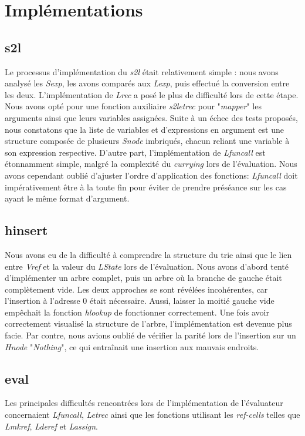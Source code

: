 \documentclass[12pt]{article}
\begin{document}
\section{Implémentations}
\subsection{s2l}
    Le processus d'implémentation du \textit{s2l} était relativement simple : nous avons analysé les \textit{Sexp}, les avons comparés aux \textit{Lexp}, puis effectué la conversion entre les deux. L'implémentation de \textit{Lrec} a posé le plus de difficulté lors de cette étape. Nous avons opté pour une fonction auxiliaire \textit{s2letrec} pour "\textit{mapper}" les arguments ainsi que leurs variables assignées. Suite à un échec des tests proposés, nous constatons que la liste de variables et d'expressions en argument est une structure composée de plusieurs \textit{Snode} imbriqués, chacun reliant une variable à son expression respective. D'autre part, l'implémentation de \textit{Lfuncall} est étonnamment simple, malgré la complexité du \textit{currying} lors de l'évaluation. Nous avons cependant oublié d'ajuster l'ordre d'application des fonctions: \textit{Lfuncall} doit impérativement être à la toute fin pour éviter de prendre préséance sur les cas ayant le même format d'argument.
\pagebreak
\subsection{hinsert}
    Nous avons eu de la difficulté à comprendre la structure du trie ainsi que le lien entre \textit{Vref} et la valeur du \textit{LState} lors de l'évaluation. Nous avons d'abord tenté d'implémenter un arbre complet, puis un arbre où la branche de gauche était complètement vide. Les deux approches se sont révélées incohérentes, car l'insertion à l'adresse 0 était nécessaire. Aussi, laisser la moitié gauche vide empêchait la fonction \textit{hlookup} de fonctionner correctement. Une fois avoir correctement visualisé la structure de l'arbre, l'implémentation est devenue plus facie. Par contre, nous avions oublié de vérifier la parité lors de l'insertion sur un \textit{Hnode} "\textit{Nothing}", ce qui entraînait une insertion aux mauvais endroits.


\subsection{eval}
    Les principales difficultés rencontrées lors de l'implémentation de l'évaluateur concernaient \textit{Lfuncall}, \textit{Letrec} ainsi que les fonctions utilisant les \textit{ref-cells} telles que \textit{Lmkref}, \textit{Lderef} et \textit{Lassign}.
\end{document}
